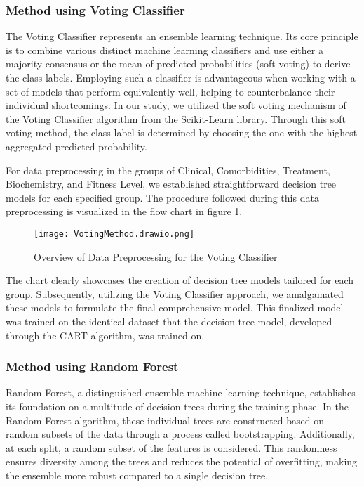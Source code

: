 \subsubsection{Method using Voting Classifier}
The Voting Classifier represents an ensemble learning technique. Its core principle is to combine various distinct machine learning classifiers and use either a majority consensus or the mean of predicted probabilities (soft voting) to derive the class labels. Employing such a classifier is advantageous when working with a set of models that perform equivalently well, helping to counterbalance their individual shortcomings. In our study, we utilized the soft voting mechanism of the Voting Classifier algorithm from the Scikit-Learn library. Through this soft voting method, the class label is determined by choosing the one with the highest aggregated predicted probability.

For data preprocessing in the groups of Clinical, Comorbidities, Treatment, Biochemistry, and Fitness Level, we established straightforward decision tree models for each specified group. The procedure followed during this data preprocessing is visualized in the flow chart in figure \ref{fig:flow chart of data processing for voting classifier}.
\begin{figure}[H]
\centering
\texttt{[image: VotingMethod.drawio.png]}
\caption{Overview of Data Preprocessing for the Voting Classifier}
\label{fig:flow chart of data processing for voting classifier}
\end{figure}

The chart clearly showcases the creation of decision tree models tailored for each group. Subsequently, utilizing the Voting Classifier approach, we amalgamated these models to formulate the final comprehensive model. This finalized model was trained on the identical dataset that the decision tree model, developed through the CART algorithm, was trained on.


\subsubsection{Method using Random Forest}
Random Forest, a distinguished ensemble machine learning technique, establishes its foundation on a multitude of decision trees during the training phase. In the Random Forest algorithm, these individual trees are constructed based on random subsets of the data through a process called bootstrapping. Additionally, at each split, a random subset of the features is considered. This randomness ensures diversity among the trees and reduces the potential of overfitting, making the ensemble more robust compared to a single decision tree.

